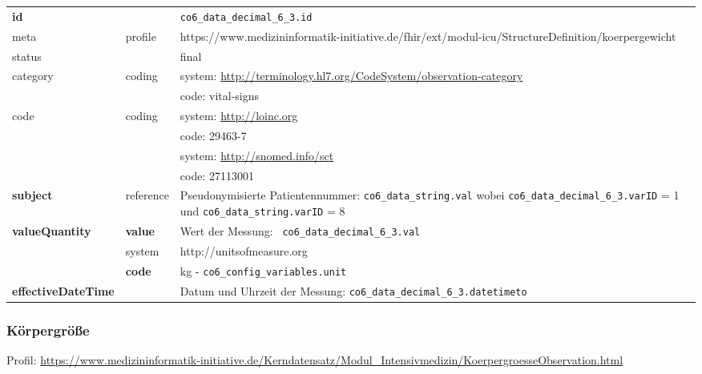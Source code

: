 \begin{longtable}{|l|l|p{7.5cm}|}
        \hline
        \rowcolor{lightgray} \multicolumn{3}{|l|}{Data Mapping (inhaltlich)} \\ \hline
        \textbf{id} &  & \texttt{co6\_data\_decimal\_6\_3.id} \\ \hline
	meta & profile & https://www.medizininformatik-initiative.de/fhir/ext/modul-icu/StructureDefinition/koerpergewicht \\ \hline 
	status &  & final   \\ \hline 
	category & coding & system: \url{http://terminology.hl7.org/CodeSystem/observation-category} \\
\cline{3-3}
	& & code: vital-signs \\ \hline
	code & coding & system: \url{http://loinc.org} \\ 
	\cline{3-3} 
	&  & code: 29463-7 \\ 
	\cline{3-3} 
	&  & system: \url{http://snomed.info/sct} \\ 
	\cline{3-3}
	&  & code: 27113001 \\ \hline
	\textbf{subject} & reference & Pseudonymisierte Patientennummer: \texttt{co6\_data\_string.val} wobei \texttt{co6\_data\_decimal\_6\_3.varID} = 1 und \texttt{co6\_data\_string.varID} = 8 \\ \hline
	 \textbf{valueQuantity}  & \textbf{value} & Wert der Messung: \texttt{
co6\_data\_decimal\_6\_3.val} \\
        \cline{2-3}
         & system & http://unitsofmeasure.org \\
         \cline{2-3}
         & \textbf{code} & kg - \texttt{co6\_config\_variables.unit} \\ \hline
     \textbf{effectiveDateTime}  & & Datum und Uhrzeit der Messung: \texttt{co6\_data\_decimal\_6\_3.datetimeto} \\ \hline
\end{longtable}

\subsubsection{Körpergröße} 
Profil: \url{https://www.medizininformatik-initiative.de/Kerndatensatz/Modul_Intensivmedizin/KoerpergroesseObservation.html}

